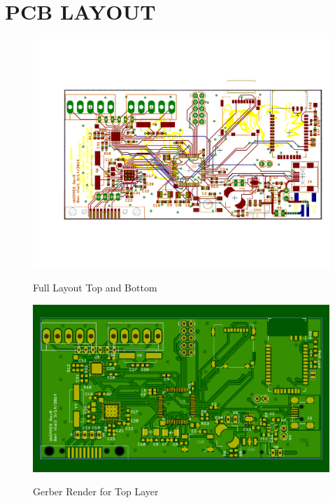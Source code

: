 \chapter*{PCB LAYOUT}
\begin{figure}
\begin{center}
	\label{fig:FullLayout}
	\includegraphics[angle=0,scale=1,width=1\textwidth]{Images/rev1D_PCB.pdf} 
	\caption{Full Layout Top and Bottom}
\end{center}
\end{figure}


\begin{figure}
\begin{center}
	\label{fig:TOPGerber}
	\includegraphics[angle=0,scale=1,width=1\textwidth]{Images/Rev5_TOPGERB.png} 
	\caption{Gerber Render for Top Layer}
\end{center}
\end{figure}


